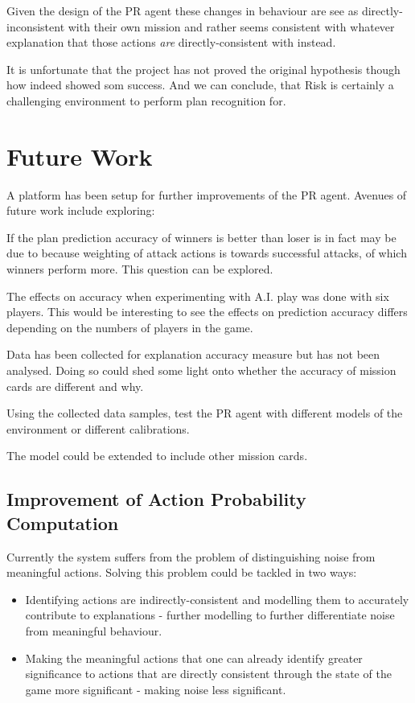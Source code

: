 \documentclass[parskip]{cs4rep}
\begin{document}
Given the design of the PR agent these changes in behaviour are see as directly-inconsistent with their own mission and rather seems consistent with whatever explanation that those actions \textit{are} directly-consistent with instead.

It is unfortunate that the project has not proved the original hypothesis though how indeed showed som success. And we can conclude, that Risk is certainly a challenging environment to perform plan recognition for.

\section{Future Work}

A platform has been setup for further improvements of the PR agent. Avenues of future work include exploring:

If the plan prediction accuracy of winners is better than loser is in fact may be due to because weighting of attack actions is towards successful attacks, of which winners perform more. This question can be explored.

The effects on accuracy when experimenting with A.I. play was done with six players. This would be interesting to see the effects on prediction accuracy differs depending on the numbers of players in the game.

Data has been collected for explanation accuracy measure but has not been analysed. Doing so could shed some light onto whether the accuracy of mission cards are different and why.

Using the collected data samples, test the PR agent with different models of the environment or different calibrations.

The model could be extended to include other mission cards.

\subsection{Improvement of Action Probability Computation}

Currently the system suffers from the problem of distinguishing noise from meaningful actions. Solving this problem could be tackled in two ways:

\begin{itemize}
\item
Identifying actions are indirectly-consistent and modelling them to accurately contribute to explanations - further modelling to further differentiate noise from meaningful behaviour.
\item
Making the meaningful actions that one can already identify greater significance to actions that are directly consistent through the state of the game more significant - making noise less significant.
\end{itemize}
\end{document}
